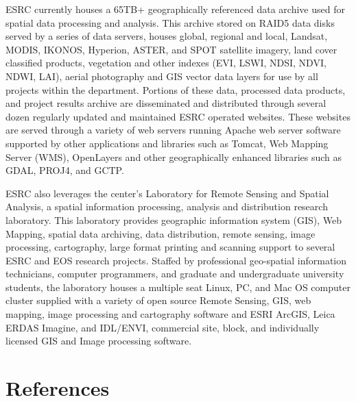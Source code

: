 \documentclass[
  letterpaper,
  DIV=11,
  numbers=noendperiod]{scrreprt}
\newlength{\cslhangindent}
\newenvironment{CSLReferences}[2] %
 {\begin{list}{}{%
  \setlength{\itemindent}{0pt}
  \setlength{\leftmargin}{0pt}
  \setlength{\parsep}{0pt}
  \ifodd #1
   \setlength{\leftmargin}{\cslhangindent}
   \setlength{\itemindent}{-1\cslhangindent}
  \fi
  \setlength{\itemsep}{#2\baselineskip}}}
 {\end{list}}
\begin{document}
ESRC currently houses a 65TB+ geographically referenced data archive
used for spatial data processing and analysis. This archive stored on
RAID5 data disks served by a series of data servers, houses global,
regional and local, Landsat, MODIS, IKONOS, Hyperion, ASTER, and SPOT
satellite imagery, land cover classified products, vegetation and other
indexes (EVI, LSWI, NDSI, NDVI, NDWI, LAI), aerial photography and GIS
vector data layers for use by all projects within the department.
Portions of these data, processed data products, and project results
archive are disseminated and distributed through several dozen regularly
updated and maintained ESRC operated websites. These websites are served
through a variety of web servers running Apache web server software
supported by other applications and libraries such as Tomcat, Web
Mapping Server (WMS), OpenLayers and other geographically enhanced
libraries such as GDAL, PROJ4, and GCTP.

ESRC also leverages the center's Laboratory for Remote Sensing and
Spatial Analysis, a spatial information processing, analysis and
distribution research laboratory. This laboratory provides geographic
information system (GIS), Web Mapping, spatial data archiving, data
distribution, remote sensing, image processing, cartography, large
format printing and scanning support to several ESRC and EOS research
projects. Staffed by professional geo-spatial information technicians,
computer programmers, and graduate and undergraduate university
students, the laboratory houses a multiple seat Linux, PC, and Mac OS
computer cluster supplied with a variety of open source Remote Sensing,
GIS, web mapping, image processing and cartography software and ESRI
ArcGIS, Leica ERDAS Imagine, and IDL/ENVI, commercial site, block, and
individually licensed GIS and Image processing software.


\chapter*{References}\label{references}


\label{refs}
\begin{CSLReferences}{0}{1}
\end{CSLReferences}
\end{document}
